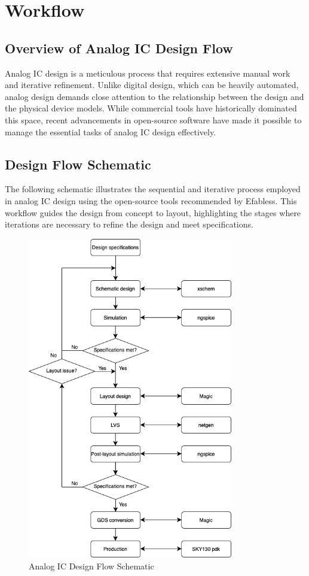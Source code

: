 \chapter{Workflow}
\label{chap:workflow}

\section{Overview of Analog IC Design Flow}

Analog IC design is a meticulous process that requires extensive manual work and iterative refinement. Unlike digital design, which can be heavily automated, analog design demands close attention to the relationship between the design and the physical device models. While commercial tools have historically dominated this space, recent advancements in open-source software have made it possible to manage the essential tasks of analog IC design effectively.

\section{Design Flow Schematic}

The following schematic illustrates the sequential and iterative process employed in analog IC design using the open-source tools recommended by Efabless. This workflow guides the design from concept to layout, highlighting the stages where iterations are necessary to refine the design and meet specifications.

\begin{figure}[h]
    \centering
    \includegraphics[width=0.8\textwidth]{Figures/Workflow.drawio.png}
    \caption{Analog IC Design Flow Schematic}
    \label{fig:workflow_schematic}
\end{figure}

